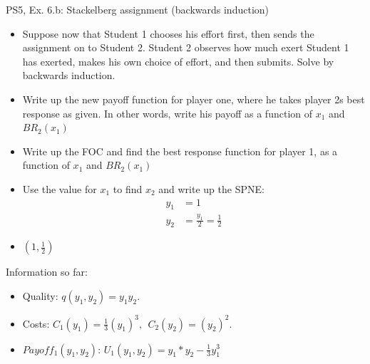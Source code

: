 \begin{frame}{PS5, Ex. 6.b: Stackelberg assignment (backwards induction)}
    \begin{itemize}
    \item[(b)] Suppose now that Student 1 chooses his effort first, then sends the assignment on to Student 2. Student 2 observes how much exert Student 1 has exerted, makes his own choice of effort, and then submits. Solve by backwards induction.
    \end{itemize}
    \vfill\null
  \begin{multicols}{2}
    \begin{itemize}
      \item[(Step 1)] Write up the new payoff function for player one, where he takes player 2s best response as given. In other words, write his payoff as a function of \begin{math}x_1\end{math} and \begin{math}BR_2(x_1)\end{math}
      \item[(Step 2)] Write up the FOC and find the best response function for player 1, as a function of \begin{math}x_1\end{math} and \begin{math}BR_2(x_1)\end{math}
      \item[(Step 3)] Use the value for $x_1$ to find $x_2$ and write up the SPNE:
      \begin{align*}
          y_1&=1\\
          y_2&=\frac{y_1}{2}=\frac{1}{2}
      \end{align*}
      \item[SPNE:] \begin{math}\left(1,\frac{1}{2}\right)\end{math}
    \end{itemize}
    \vfill\null \columnbreak
    Information so far:
    \begin{itemize}
        \item[1] Quality: $q(y_1, y_2) = y_1y_2.$\\
        \item[2] Costs: $C_1(y_1) = \frac{1}{3}(y_1)^3,\ \ C_2(y_2) = (y_2)^2.$\\
        \item[3] $Payoff_1(y_1,y_2)$: $U_1(y_1,y_2) = y_1*y_2-\frac{1}{3}y_1^3$ \\

\end{itemize}
\end{multicols}
\end{frame}
